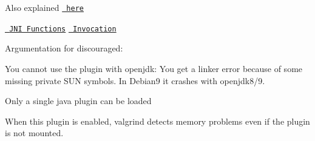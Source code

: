 Also explained \href{https://docs.oracle.com/javase/7/docs/technotes/guides/jni/spec/types.html\#wp15773}{\texttt{ here}}

\href{https://docs.oracle.com/javase/7/docs/technotes/guides/jni/spec/functions.html}{\texttt{ J\+NI Functions}} \href{https://docs.oracle.com/javase/7/docs/technotes/guides/jni/spec/invocation.html}{\texttt{ Invocation}}

Argumentation for discouraged\+:


\begin{DoxyItemize}
\item You cannot use the plugin with openjdk\+: You get a linker error because of some missing private S\+UN symbols. In Debian9 it crashes with openjdk8/9.
\item Only a single java plugin can be loaded
\item When this plugin is enabled, valgrind detects memory problems even if the plugin is not mounted. 
\end{DoxyItemize}